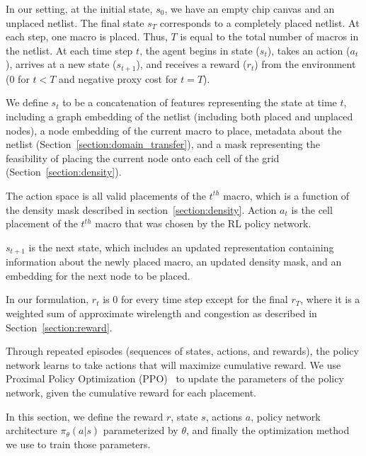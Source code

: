 \documentclass{article}
\begin{document}
In our setting, at the initial state, $s_0$, we have an empty chip canvas and an unplaced netlist. The final state $s_T$ corresponds to a completely placed netlist. At each step, one macro is placed. Thus, $T$ is equal to the total number of macros in the netlist. At each time step $t$, the agent begins in state ($s_t$), takes an action ($a_t$), arrives at a new state ($s_{t+1}$), and receives a reward ($r_t$) from the environment (0 for $t<T$ and negative proxy cost for $t=T$). 

We define $s_t$ to be a concatenation of features representing the state at time $t$, including a graph embedding of the netlist (including both placed and unplaced nodes), a node embedding of the current macro to place, metadata about the netlist (Section~\ref{section:domain_transfer}), and a mask representing the feasibility of placing the current node onto each cell of the grid (Section~\ref{section:density}).

The action space is all valid placements of the $t^{th}$ macro, which is a function of the density mask described in section~\ref{section:density}. Action $a_t$ is the cell placement of the $t^{th}$ macro that was chosen by the RL policy network. 

$s_{t+1}$ is the next state, which includes an updated representation containing information about the newly placed macro, an updated density mask, and an embedding for the next node to be placed. 

In our formulation, $r_t$ is $0$ for every time step except for the final $r_T$, where it is a weighted sum of approximate wirelength and congestion as described in Section~\ref{section:reward}.

Through repeated episodes (sequences of states, actions, and rewards), the policy network learns to take actions that will maximize cumulative reward. We use Proximal Policy Optimization (PPO)~\cite{ppo17} to update the parameters of the policy network, given the cumulative reward for each placement. 

In this section, we define the reward $r$, state $s$, actions $a$, policy network architecture $\pi_{\theta}(a|s)$ parameterized by $\theta$, and finally the optimization method we use to train those parameters.
\end{document}
